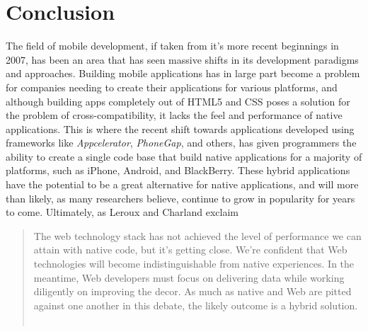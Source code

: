 \documentclass[11pt]{article}
\begin{document}
\section{Conclusion}
The field of mobile development, if taken from it's more recent beginnings in 2007, has been an area that has seen massive shifts in its development paradigms and approaches.  Building mobile applications has in large part become a problem for companies needing to create their applications for various platforms, and although building apps completely out of HTML5 and CSS poses a solution for the problem of cross-compatibility, it lacks the feel and performance of native applications.  This is where the recent shift towards applications developed using frameworks like {\it Appcelerator}, {\it PhoneGap}, and others, has given programmers the ability to create a single code base that build native applications for a majority of platforms, such as iPhone, Android, and BlackBerry.  These hybrid applications have the potential to be a great alternative for native applications, and will more than likely, as many researchers believe, continue to grow in popularity for years to come. Ultimately, as Leroux and Charland exclaim 

\begin{quote}
The web technology stack has not achieved the level of performance we can attain with native code, but it's getting close.  We're confident that Web technologies will become indistinguishable from native experiences.  In the meantime, Web developers must focus on delivering data while working diligently on improving the decor.  As much as native and Web are pitted against one another in this debate, the likely outcome is a hybrid solution. ~\cite{Leroux2011}
\end{quote} 



\end{document}

